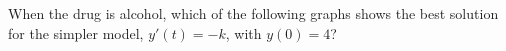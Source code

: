 \documentclass{ximera}
\begin{document}
\begin{question}
When the drug is alcohol, which of the following graphs shows the best solution for the simpler model, $y'(t)=-k$, with $y(0)=4$?
\begin{multipleChoice}
\end{multipleChoice}


\end{question}
\end{document}
